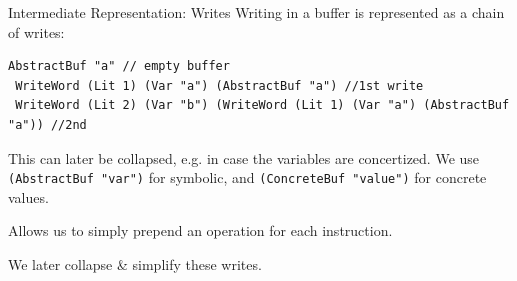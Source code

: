 \documentclass[aspectratio=169]{beamer}
\begin{document}




 \begin{frame}[fragile=singleslide]{Intermediate Representation: Writes}
 Writing in a buffer is represented as a chain of writes:
 \begin{Verbatim}[frame=single, framerule=0.2mm, framesep=2mm,fontsize=\small]
 AbstractBuf "a" // empty buffer
 WriteWord (Lit 1) (Var "a") (AbstractBuf "a") //1st write
 WriteWord (Lit 2) (Var "b") (WriteWord (Lit 1) (Var "a") (AbstractBuf "a")) //2nd
 \end{Verbatim}

 This can later be collapsed, e.g. in case the variables are concertized. We use \texttt{(AbstractBuf "var")} for symbolic, and \texttt{(ConcreteBuf "value")} for concrete values.
 \bigskip

 Allows us to simply prepend an operation for each instruction.

 We later collapse \& simplify these writes.
 \end{frame}
\end{document}
